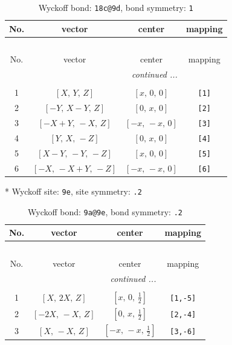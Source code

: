 \documentclass[fleqn,8pt]{jsarticle}
\begin{document}
\renewcommand{\arraystretch}{1.2}
\begin{longtable}{cccc}
\caption{Wyckoff bond: {\tt 18c@9d}, bond symmetry: {\tt 1}}
 \\
 \hline \hline
No. & vector & center & mapping \\ \hline \endfirsthead

\multicolumn{3}{l}{\tablename\ \thetable{}} \\
 \hline \hline
No. & vector & center & mapping \\ \hline \endhead

 \hline \hline
\multicolumn{3}{r}{\footnotesize\it continued ...} \\ \endfoot

 \hline \hline
\multicolumn{3}{r}{} \\ \endlastfoot

1 & $\left[ X,\, Y,\, Z \right]$ & $\left[ x,\, 0,\, 0 \right]$ & {\tt [1]} \\ \hline
2 & $\left[ - Y,\, X - Y,\, Z \right]$ & $\left[ 0,\, x,\, 0 \right]$ & {\tt [2]} \\ \hline
3 & $\left[ - X + Y,\, - X,\, Z \right]$ & $\left[ - x,\, - x,\, 0 \right]$ & {\tt [3]} \\ \hline
4 & $\left[ Y,\, X,\, - Z \right]$ & $\left[ 0,\, x,\, 0 \right]$ & {\tt [4]} \\ \hline
5 & $\left[ X - Y,\, - Y,\, - Z \right]$ & $\left[ x,\, 0,\, 0 \right]$ & {\tt [5]} \\ \hline
6 & $\left[ - X,\, - X + Y,\, - Z \right]$ & $\left[ - x,\, - x,\, 0 \right]$ & {\tt [6]} \\
\end{longtable}
* Wyckoff site: {\tt 9e}, site symmetry: {\tt .2}
\renewcommand{\arraystretch}{1.2}
\begin{longtable}{cccc}
\caption{Wyckoff bond: {\tt 9a@9e}, bond symmetry: {\tt .2}}
 \\
 \hline \hline
No. & vector & center & mapping \\ \hline \endfirsthead

\multicolumn{3}{l}{\tablename\ \thetable{}} \\
 \hline \hline
No. & vector & center & mapping \\ \hline \endhead

 \hline \hline
\multicolumn{3}{r}{\footnotesize\it continued ...} \\ \endfoot

 \hline \hline
\multicolumn{3}{r}{} \\ \endlastfoot

1 & $\left[ X,\, 2 X,\, Z \right]$ & $\left[ x,\, 0,\, \frac{1}{2} \right]$ & {\tt [1,-5]} \\ \hline
2 & $\left[ - 2 X,\, - X,\, Z \right]$ & $\left[ 0,\, x,\, \frac{1}{2} \right]$ & {\tt [2,-4]} \\ \hline
3 & $\left[ X,\, - X,\, Z \right]$ & $\left[ - x,\, - x,\, \frac{1}{2} \right]$ & {\tt [3,-6]} \\
\end{longtable}
\end{document}
